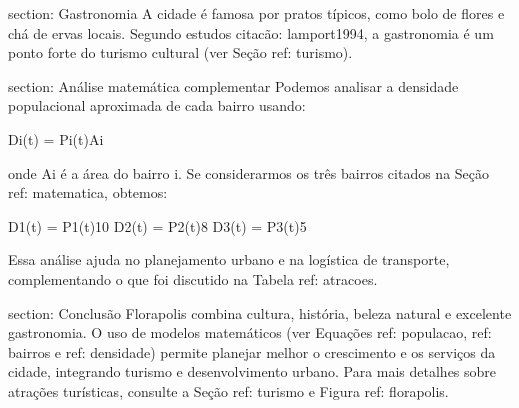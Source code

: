 \documentclass[12pt]{article}
\begin{document}
section: Gastronomia
A cidade é famosa por pratos típicos, como bolo de flores e chá de ervas locais.  
Segundo estudos citacão: lamport1994, a gastronomia é um ponto forte do turismo cultural (ver Seção ref: turismo).

section: Análise matemática complementar
Podemos analisar a densidade populacional aproximada de cada bairro usando:


Di(t) = {Pi(t)}{Ai}

onde Ai é a área do bairro i.  
Se considerarmos os três bairros citados na Seção ref: matematica, obtemos:

D1(t) = P1(t)10 
D2(t) = P2(t)8 
D3(t) = P3(t)5 

Essa análise ajuda no planejamento urbano e na logística de transporte, complementando o que foi discutido na Tabela ref: atracoes.

section: Conclusão
Florapolis combina cultura, história, beleza natural e excelente gastronomia.  
O uso de modelos matemáticos (ver Equações ref: populacao, ref: bairros e ref: densidade) permite planejar melhor o crescimento e os serviços da cidade, integrando turismo e desenvolvimento urbano.  
Para mais detalhes sobre atrações turísticas, consulte a Seção ref: turismo e Figura ref: florapolis.

\end{document}
